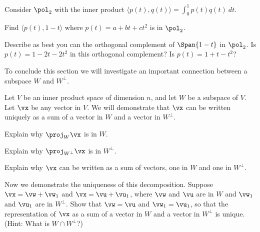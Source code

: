 \begin{activity} Consider $\pol_2$ with the inner product $\langle p(t), q(t) \rangle = \int_0^1 p(t)q(t) \ dt$.
\ba 
\item Find $\langle p(t), 1-t \rangle$ where $p(t)=a+bt+ct^2$ is in $\pol_2$.

\item Describe as best you can the orthogonal complement of $\Span\{1-t\}$ in $\pol_2$. Is $p(t)=1-2t-2t^2$ in this orthogonal complement? Is $p(t)=1+t-t^2$?
\ea

\end{activity}

To conclude this section we will investigate an important connection between a subspace $W$ and $W^{\perp}$. 

\begin{activity} \label{act:6_c_decompose_ips} Let $V$ be an inner product space of dimension $n$, and let $W$ be a subspace of $V$. Let $\vx$ be any vector in $V$. We will demonstrate that $\vx$ can be written uniquely as a sum of a vector in $W$ and a vector in $W^{\perp}$. 
	\ba
	\item Explain why $\proj_W \vx$ is in $W$.
	
	\item Explain why $\proj_{W^{\perp}} \vx$ is in $W^{\perp}$. 

	\item Explain why $\vx$ can be written as a sum of vectors, one in $W$ and one in $W^{\perp}$. 

	\item Now we demonstrate the uniqueness of this decomposition. Suppose $\vx = \vw+\vw_1$ and $\vx = \vu+\vu_1$, where $\vw$ and $\vu$ are in $W$ and $\vw_1$ and $\vu_1$ are in $W^{\perp}$. Show that $\vw=\vu$ and $\vw_1 = \vu_1$, so that the representation of $\vx$ as a sum of a vector in $W$ and a vector in $W^{\perp}$ is unique. (Hint: What is $W \cap W^{\perp}$?)


	\ea
	
\end{activity}

